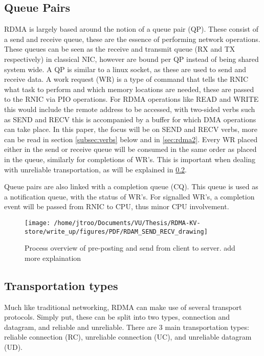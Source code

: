 \subsection{Queue Pairs}\label{subsec:queue-pairs}
RDMA is largely based around the notion of a queue pair (QP).
These consist of a send and receive queue, these are the essence of performing network operations.
These queues can be seen as the receive and transmit queue (RX and TX respectively) in classical NIC, however are bound per QP instead of being shared system wide.
A QP is similar to a linux socket, as these are used to send and receive data.
A work request (WR) is a type of command that tells the RNIC what task to perform and which memory locations are needed, these are passed to the RNIC via PIO operations.
For RDMA operations like READ and WRITE this would include the remote address to be accessed, with two-sided verbs such as SEND and RECV this is accompanied by a buffer for which DMA operations can take place.
In this paper, the focus will be on SEND and RECV verbs, more can be read in section \ref{subsec:verbs} below and in \ref{sec:rdma2}.
Every WR placed either in the send or receive queue will be consumed in the same order as placed in the queue, similarly for completions of WR's.
This is important when dealing with unreliable transportation, as will be explained in \ref{subsec:transportation-types}.

Queue pairs are also linked with a completion queue (CQ).
This queue is used as a notification queue, with the status of WR's.
For signalled WR's, a completion event will be passed from RNIC to CPU, thus minor CPU involvement.

\begin{figure}
    \centering
    \texttt{[image: /home/jtroo/Documents/VU/Thesis/RDMA-KV-store/write\_up/figures/PDF/RDAM\_SEND\_RECV\_drawing]}
    \caption[Process overview of pre-posting and send from client to server.]{Process overview of pre-posting and send from client to server. add more explaination}
    \label{fig:send_recv_drawing}
\end{figure}


\subsection{Transportation types}\label{subsec:transportation-types}
Much like traditional networking, RDMA can make use of several transport protocols.
Simply put, these can be split into two types, connection and datagram, and reliable and unreliable.
There are 3 main transportation types: reliable connection (RC), unreliable connection (UC), and unreliable datagram (UD).

